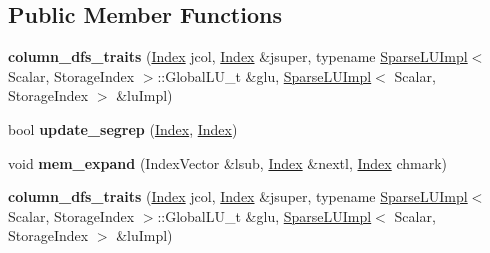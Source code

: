 \subsection*{Public Member Functions}
\begin{DoxyCompactItemize}
\item 
\mbox{\label{struct_eigen_1_1internal_1_1column__dfs__traits_a84be35a20707d05cdf72d18e7755ae96}} 
{\bfseries column\+\_\+dfs\+\_\+traits} (\hyperlink{namespace_eigen_a62e77e0933482dafde8fe197d9a2cfde}{Index} jcol, \hyperlink{namespace_eigen_a62e77e0933482dafde8fe197d9a2cfde}{Index} \&jsuper, typename \hyperlink{group___sparse_l_u___module_class_eigen_1_1internal_1_1_sparse_l_u_impl}{Sparse\+L\+U\+Impl}$<$ Scalar, Storage\+Index $>$\+::Global\+L\+U\+\_\+t \&glu, \hyperlink{group___sparse_l_u___module_class_eigen_1_1internal_1_1_sparse_l_u_impl}{Sparse\+L\+U\+Impl}$<$ Scalar, Storage\+Index $>$ \&lu\+Impl)
\item 
\mbox{\label{struct_eigen_1_1internal_1_1column__dfs__traits_a034a1bf7ad2d7a4ba7e8c91463dc3f36}} 
bool {\bfseries update\+\_\+segrep} (\hyperlink{namespace_eigen_a62e77e0933482dafde8fe197d9a2cfde}{Index}, \hyperlink{namespace_eigen_a62e77e0933482dafde8fe197d9a2cfde}{Index})
\item 
\mbox{\label{struct_eigen_1_1internal_1_1column__dfs__traits_a5b48ce6fa5fa373fd784033df70959ff}} 
void {\bfseries mem\+\_\+expand} (Index\+Vector \&lsub, \hyperlink{namespace_eigen_a62e77e0933482dafde8fe197d9a2cfde}{Index} \&nextl, \hyperlink{namespace_eigen_a62e77e0933482dafde8fe197d9a2cfde}{Index} chmark)
\item 
\mbox{\label{struct_eigen_1_1internal_1_1column__dfs__traits_a84be35a20707d05cdf72d18e7755ae96}} 
{\bfseries column\+\_\+dfs\+\_\+traits} (\hyperlink{namespace_eigen_a62e77e0933482dafde8fe197d9a2cfde}{Index} jcol, \hyperlink{namespace_eigen_a62e77e0933482dafde8fe197d9a2cfde}{Index} \&jsuper, typename \hyperlink{group___sparse_l_u___module_class_eigen_1_1internal_1_1_sparse_l_u_impl}{Sparse\+L\+U\+Impl}$<$ Scalar, Storage\+Index $>$\+::Global\+L\+U\+\_\+t \&glu, \hyperlink{group___sparse_l_u___module_class_eigen_1_1internal_1_1_sparse_l_u_impl}{Sparse\+L\+U\+Impl}$<$ Scalar, Storage\+Index $>$ \&lu\+Impl)

\end{DoxyCompactItemize}
